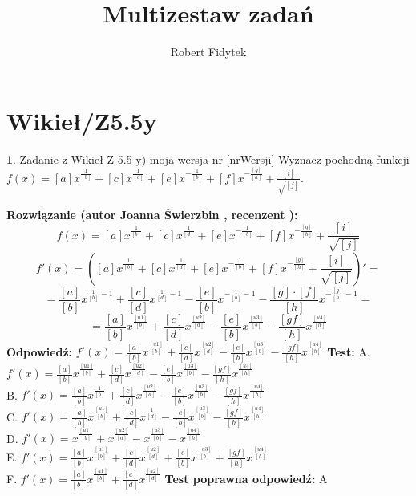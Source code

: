 \documentclass[12pt, a4paper]{article}
\title{Multizestaw zadań}
\author{Robert Fidytek}
\date{}
\theoremstyle{definition} %
\newtheorem{zad}{}
\newcommand{\kategoria}[1]{\section{#1}} %
\newcommand{\zadStart}[1]{\begin{zad}#1\newline} %
\newcommand{\zadStop}{\end{zad}}   %
\newcommand{\rozwStart}[2]{\noindent \textbf{Rozwiązanie (autor #1 , recenzent #2): }\newline} %
\newcommand{\rozwStop}{\newline}                                            %
\newcommand{\odpStart}{\noindent \textbf{Odpowiedź:}\newline}    %
\newcommand{\odpStop}{\newline}                                             %
\newcommand{\testStart}{\noindent \textbf{Test:}\newline} %
\newcommand{\testStop}{\newline} %
\newcommand{\kluczStart}{\noindent \textbf{Test poprawna odpowiedź:}\newline} %
\newcommand{\kluczStop}{\newline} %
\begin{document}
\maketitle


\kategoria{Wikieł/Z5.5y}
\zadStart{Zadanie z Wikieł Z 5.5 y) moja wersja nr [nrWersji]}
Wyznacz pochodną funkcji \\ $f(x)=[a]x^{\frac{1}{[b]}}+[c]x^{\frac{1}{[d]}}+[e]x^{-\frac{1}{[b]}}+[f]x^{-\frac{[g]}{[h]}}+\frac{[i]}{\sqrt{[j]}} $.
\zadStop
\rozwStart{Joanna Świerzbin}{}
$$ f(x)=[a]x^{\frac{1}{[b]}}+[c]x^{\frac{1}{[d]}}+[e]x^{-\frac{1}{[b]}}+[f]x^{-\frac{[g]}{[h]}}+\frac{[i]}{\sqrt{[j]}}  $$
$$ f'(x)=\left([a]x^{\frac{1}{[b]}}+[c]x^{\frac{1}{[d]}}+[e]x^{-\frac{1}{[b]}}+[f]x^{-\frac{[g]}{[h]}}+\frac{[i]}{\sqrt{[j]}}\right)' =  $$
$$ =\frac{[a]}{[b]}x^{\frac{1}{[b]}-1}+\frac{[c]}{[d]}x^{\frac{1}{[d]}-1}-\frac{[e]}{[b]}x^{-\frac{1}{[b]}-1}-\frac{[g]\cdot[f]}{[h]}x^{-\frac{[g]}{[h]}-1} =  $$
$$ =\frac{[a]}{[b]}x^{\frac{[u1]}{[b]}}+\frac{[c]}{[d]}x^{\frac{[u2]}{[d]}}-\frac{[e]}{[b]}x^{\frac{[u3]}{[b]}}-\frac{[gf]}{[h]}x^{\frac{[u4]}{[h]}} $$
\rozwStop
\odpStart
$ f'(x)  =\frac{[a]}{[b]}x^{\frac{[u1]}{[b]}}+\frac{[c]}{[d]}x^{\frac{[u2]}{[d]}}-\frac{[e]}{[b]}x^{\frac{[u3]}{[b]}}-\frac{[gf]}{[h]}x^{\frac{[u4]}{[h]}} $
\odpStop
\testStart
A. $ f'(x)  =\frac{[a]}{[b]}x^{\frac{[u1]}{[b]}}+\frac{[c]}{[d]}x^{\frac{[u2]}{[d]}}-\frac{[e]}{[b]}x^{\frac{[u3]}{[b]}}-\frac{[gf]}{[h]}x^{\frac{[u4]}{[h]}} $\\
B. $ f'(x)  =\frac{[a]}{[b]}x^{\frac{1}{[b]}}+\frac{[c]}{[d]}x^{\frac{[u2]}{[d]}}-\frac{[e]}{[b]}x^{\frac{[u3]}{[b]}}-\frac{[gf]}{[h]}x^{\frac{[u4]}{[h]}} $\\
C. $ f'(x)  =\frac{[a]}{[b]}x^{\frac{[u1]}{[b]}}+\frac{[c]}{[d]}x^{\frac{1}{[d]}}-\frac{[e]}{[b]}x^{\frac{[u3]}{[b]}}-\frac{[gf]}{[h]}x^{\frac{[u4]}{[h]}} $\\
D. $ f'(x)  =x^{\frac{[u1]}{[b]}}+x^{\frac{[u2]}{[d]}}-x^{\frac{[u3]}{[b]}}-x^{\frac{[u4]}{[h]}} $\\
E. $ f'(x) =\frac{[a]}{[b]}x^{\frac{[u1]}{[b]}}+\frac{[c]}{[d]}x^{\frac{[u2]}{[d]}}+\frac{[e]}{[b]}x^{\frac{[u3]}{[b]}}+\frac{[gf]}{[h]}x^{\frac{[u4]}{[h]}} $\\
F. $ f'(x)  =\frac{[a]}{[b]}x^{\frac{[u1]}{[b]}}+\frac{[c]}{[d]}x^{\frac{[u2]}{[d]}} $
\testStop
\kluczStart
A
\kluczStop
\end{document}
